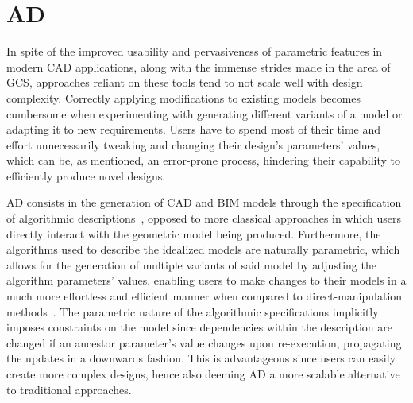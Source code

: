 \section{\acl{AD}}%
\label{sec:intro.ad}

In spite of the improved usability and pervasiveness of parametric features in
modern \ac{CAD} applications, along with the immense strides made in the area of
\ac{GCS}, approaches reliant on these tools tend to not scale well with design
complexity.  Correctly applying modifications to existing models becomes
cumbersome when experimenting with generating different variants of a model or
adapting it to new requirements.  Users have to spend most of their time and
effort unnecessarily tweaking and changing their design's parameters' values,
which can be, as mentioned, an error-prone process, hindering their capability
to efficiently produce novel designs.

\Ac{AD} consists in the generation of \ac{CAD} and \ac{BIM} models through the
specification of algorithmic descriptions~\cite{McCormack:2004:GDPDR}, opposed
to more classical approaches in which users directly interact with the geometric
model being produced.  Furthermore, the algorithms used to describe the
idealized models are naturally parametric, which allows for the generation of
multiple variants of said model by adjusting the algorithm parameters' values,
enabling users to make changes to their models in a much more effortless and
efficient manner when compared to direct-manipulation
methods~\cite{Leitao:2013:PESLGD}.  The parametric nature of the algorithmic
specifications implicitly imposes constraints on the model since dependencies
within the description are changed if an ancestor parameter's value changes upon
re-execution, propagating the updates in a downwards fashion.  This is
advantageous since users can easily create more complex designs, hence also
deeming \ac{AD} a more scalable alternative to traditional approaches.

